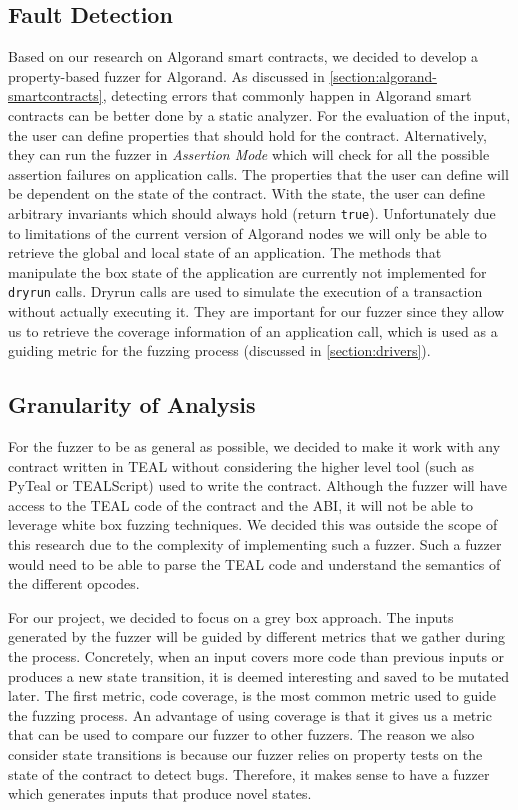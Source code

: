 \subsection*{Fault Detection}
Based on our research on Algorand smart contracts, we decided to develop a property-based fuzzer for Algorand.
As discussed in \ref{section:algorand-smartcontracts}, detecting errors that commonly happen in Algorand smart contracts can be better done by a static analyzer.
For the evaluation of the input, the user can define properties that should hold for the contract.
Alternatively, they can run the fuzzer in \textit{Assertion Mode} which will check for all the possible assertion failures on application calls.
The properties that the user can define will be dependent on the state of the contract.
With the state, the user can define arbitrary invariants which should always hold (return \texttt{true}).
Unfortunately due to limitations of the current version of Algorand nodes we will only be able to retrieve the global and local state of an application.
The methods that manipulate the box state of the application are currently not implemented for \texttt{dryrun} calls.
Dryrun calls are used to simulate the execution of a transaction without actually executing it.
They are important for our fuzzer since they allow us to retrieve the coverage information of an application call, which is used as a guiding metric for the fuzzing process (discussed in \ref{section:drivers}).

\subsection*{Granularity of Analysis}
For the fuzzer to be as general as possible, we decided to make it work with any contract written in \ac{TEAL} without considering the higher level tool (such as PyTeal or TEALScript) used to write the contract.
Although the fuzzer will have access to the \ac{TEAL} code of the contract and the \ac{ABI}, it will not be able to leverage white box fuzzing techniques.
We decided this was outside the scope of this research due to the complexity of implementing such a fuzzer.
Such a fuzzer would need to be able to parse the \ac{TEAL} code and understand the semantics of the different opcodes.

For our project, we decided to focus on a grey box approach.
The inputs generated by the fuzzer will be guided by different metrics that we gather during the process.
Concretely, when an input covers more code than previous inputs or produces a new state transition, it is deemed interesting and saved to be mutated later.
The first metric, code coverage, is the most common metric used to guide the fuzzing process.
An advantage of using coverage is that it gives us a metric that can be used to compare our fuzzer to other fuzzers.
The reason we also consider state transitions is because our fuzzer relies on property tests on the state of the contract to detect bugs. Therefore, it makes sense to have a fuzzer which  generates inputs that produce novel states.

